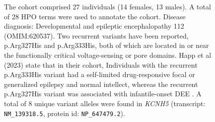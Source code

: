 \begin{figure}[htbp]
\vspace{2em}

\caption{ The cohort comprised 27 individuals (14 females, 13 males). A total of 28 HPO terms were used to annotate the cohort. Disease diagnosis: Developmental and epileptic encephalopathy 112 (OMIM:620537). Two recurrent variants have been reported, p.Arg327His and p.Arg333His, both of which are located in or near the functionally critical 
voltage-sensing or pore domains. Happ et al (2023) state that in their cohort, Individuals with the recurrent p.Arg333His variant had a self-limited 
drug-responsive focal or generalized epilepsy and normal intellect, whereas the recurrent p.Arg327His variant was associated with infantile-onset DEE \cite{PMID_36307226}. 
A total of 8 unique variant alleles were found in \textit{KCNH5} (transcript: \texttt{NM\_139318.5}, protein id: \texttt{NP\_647479.2}).}
\end{figure}
